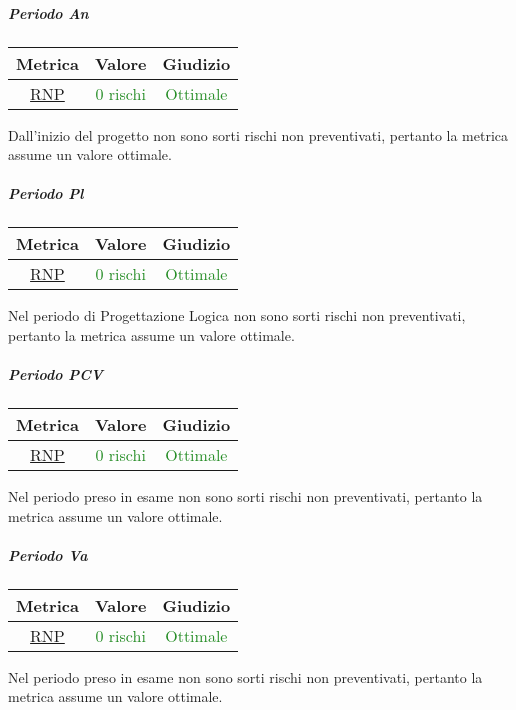 				\subparagraph{Periodo An}
				\begin{table}[H]
					\centering
					\begin{tabular}{  c | c | c}
						\hline
						\textbf{Metrica} & \textbf{Valore} & \textbf{Giudizio} \\
						\hline
						\hyperref[MRDB]{RNP}    & \textcolor{ForestGreen}{0 rischi}      & \textcolor{ForestGreen}{Ottimale}  \\\hline
					\end{tabular}
				\end{table}
					Dall'inizio del progetto non sono sorti rischi non preventivati, pertanto la metrica assume un valore ottimale.
				
				\subparagraph{Periodo Pl}
				
				\begin{table}[H]
					\centering
					\begin{tabular}{  c | c | c}
						\hline
						\textbf{Metrica} & \textbf{Valore} & \textbf{Giudizio} \\
						\hline
						\hyperref[MRDB]{RNP}    & \textcolor{ForestGreen}{0 rischi}      & \textcolor{ForestGreen}{Ottimale}  \\\hline
					\end{tabular}
				\end{table}
					Nel periodo di Progettazione Logica non sono sorti rischi non preventivati, pertanto la metrica assume un valore ottimale.
					
					\subparagraph{Periodo PCV}
					
					\begin{table}[H]
						\centering
						\begin{tabular}{  c | c | c}
							\hline
							\textbf{Metrica} & \textbf{Valore} & \textbf{Giudizio} \\
							\hline
							\hyperref[MRDB]{RNP}    & \textcolor{ForestGreen}{0 rischi}      & \textcolor{ForestGreen}{Ottimale}  \\\hline
						\end{tabular}
					\end{table}
					Nel periodo preso in esame non sono sorti rischi non preventivati, pertanto la metrica assume un valore ottimale.
					
					\subparagraph{Periodo Va}
					
					\begin{table}[H]
						\centering
						\begin{tabular}{  c | c | c}
							\hline
							\textbf{Metrica} & \textbf{Valore} & \textbf{Giudizio} \\
							\hline
							\hyperref[MRDB]{RNP}    & \textcolor{ForestGreen}{0 rischi}      & \textcolor{ForestGreen}{Ottimale}  \\\hline
						\end{tabular}
					\end{table}
					Nel periodo preso in esame non sono sorti rischi non preventivati, pertanto la metrica assume un valore ottimale.
					\newpage
					
